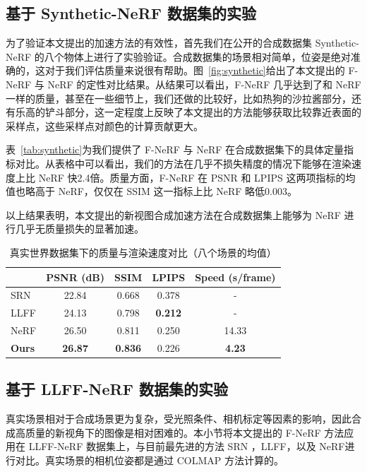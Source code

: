 \subsection{基于 Synthetic-NeRF 数据集的实验}
为了验证本文提出的加速方法的有效性，首先我们在公开的合成数据集 Synthetic-NeRF 的八个物体上进行了实验验证。合成数据集的场景相对简单，位姿是绝对准确的，这对于我们评估质量来说很有帮助。图~\ref{fig:synthetic}给出了本文提出的 F-NeRF 与 NeRF 的定性对比结果。从结果可以看出，F-NeRF 几乎达到了和 NeRF 一样的质量，甚至在一些细节上，我们还做的比较好，比如热狗的沙拉酱部分，还有乐高的铲斗部分，这一定程度上反映了本文提出的方法能够获取比较靠近表面的采样点，这些采样点对颜色的计算贡献更大。

表~\ref{tab:synthetic}为我们提供了 F-NeRF 与 NeRF 在合成数据集下的具体定量指标对比。从表格中可以看出，我们的方法在几乎不损失精度的情况下能够在渲染速度上比 NeRF 快2.4倍。质量方面，F-NeRF 在 PSNR 和 LPIPS 这两项指标的均值也略高于 NeRF，仅仅在 SSIM 这一指标上比 NeRF 略低0.003。

以上结果表明，本文提出的新视图合成加速方法在合成数据集上能够为 NeRF 进行几乎无质量损失的显著加速。

\begin{table}[htbp]
	\caption{真实世界数据集下的质量与渲染速度对比（八个场景的均值）}%
	\centering
	{\small{}\setlength\tabcolsep{12pt}
			
		\begin{tabular}{lcccc}
			\toprule
			&PSNR (dB) \uparrow & SSIM\uparrow & LPIPS\downarrow & Speed (s/frame) \downarrow\\
			\midrule
			SRN\cite{sitzmann2019scene}         & 22.84  & 0.668  & 0.378 & -\\
			LLFF\cite{mildenhall2019local}   		 & 24.13  & 0.798  & \textbf{0.212} & -\\
			NeRF\cite{mildenhall2020nerf}   		 & 26.50  & 0.811  & 0.250 & 14.33\\
			\textbf{Ours} & \textbf{26.87}  & \textbf{0.836}  & 0.226 &\textbf{4.23}\\
			\bottomrule
		\end{tabular}
	}
	\label{tab:real}
\end{table}

\subsection{基于 LLFF-NeRF 数据集的实验}
真实场景相对于合成场景更为复杂，受光照条件、相机标定等因素的影响，因此合成高质量的新视角下的图像是相对困难的。本小节将本文提出的 F-NeRF 方法应用在 LLFF-NeRF 数据集上，与目前最先进的方法 SRN\cite{sitzmann2019scene} ，LLFF\cite{mildenhall2019local}，以及 NeRF\cite{mildenhall2020nerf}进行对比。真实场景的相机位姿都是通过 COLMAP \cite{schonberger2016structure} 方法计算的。

